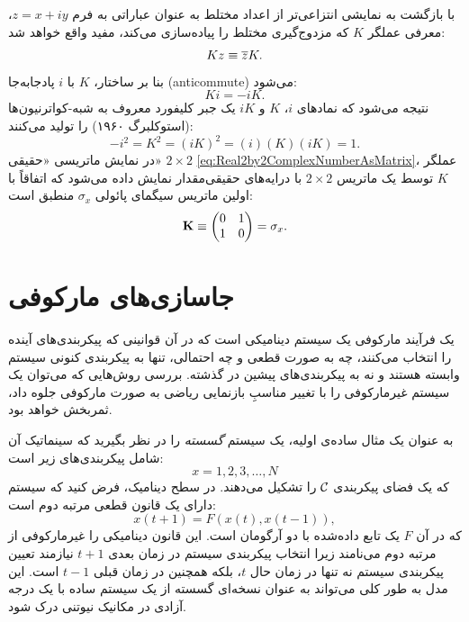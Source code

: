\documentclass{article}
\begin{document}
با بازگشت به نمایشی انتزاعی‌تر از اعداد مختلط به عنوان عباراتی به فرم $z=x+iy$، معرفی عملگر $K$ که مزدوج‌گیری مختلط را پیاده‌سازی می‌کند، مفید واقع خواهد شد:
\begin{equation}
Kz\equiv\overline{z}K.\label{eq:DefComplexConjOperator}
\end{equation}
 بنا بر ساختار، $K$ با $i$ پادجابه‌جا (anticommute) می‌شود:
\begin{equation}
Ki=-iK.\label{eq:ComplexConjOpAnticommutesWithi}
\end{equation}
 نتیجه می‌شود که نمادهای $i$، $K$ و $iK$ یک جبر کلیفورد معروف به شبه-کواترنیون‌ها (استوکلبرگ ۱۹۶۰)\nocite{Stueckelberg:1960qtirhs} را تولید می‌کنند:
\begin{equation}
-i^{2}=K^{2}=\left(iK\right)^{2}=\left(i\right)\left(K\right)\left(iK\right)=1.\label{eq:ElementaryPseudoQuaternionsAlgebra}
\end{equation}
 در نمایش ماتریسی «حقیقی» $2\times2$ \eqref{eq:Real2by2ComplexNumberAsMatrix}، عملگر $K$ توسط یک ماتریس $2\times2$ با درایه‌های حقیقی‌مقدار نمایش داده می‌شود که اتفاقاً با اولین ماتریس سیگمای پائولی $\sigma_{x}$ منطبق است:
\begin{equation}
\mathbf{K}\equiv\begin{pmatrix}0 & 1\\
1 & 0
\end{pmatrix}=\sigma_{x}.\label{eq:ComplexConjOpAsPauliSigmaMatrix}
\end{equation}

\section{جاسازی‌های مارکوفی\label{sec:Markovian-Embeddings}}

یک فرآیند مارکوفی یک سیستم دینامیکی است که در آن قوانینی که پیکربندی‌های آینده را انتخاب می‌کنند، چه به صورت قطعی و چه احتمالی، تنها به پیکربندی کنونی سیستم وابسته هستند و نه به پیکربندی‌های پیشین در گذشته. بررسی روش‌هایی که می‌توان یک سیستم غیرمارکوفی را با تغییر مناسبِ بازنمایی ریاضی به صورت مارکوفی جلوه داد، ثمر‌بخش خواهد بود.

به عنوان یک مثال ساده‌ی اولیه، یک سیستم \emph{گسسته} را در نظر بگیرید که سینماتیک آن شامل پیکربندی‌های زیر است:
\begin{equation}
x=1,2,3,\dots,N\label{eq:2ndOrderDiscreteSystemConfigurations}
\end{equation}
 که یک فضای پیکربندی $\mathcal{C}$ را تشکیل می‌دهند. در سطح دینامیک، فرض کنید که سیستم دارای یک قانون قطعی مرتبه دوم است:
\begin{equation}
x\left(t+1\right)=F\left(x\left(t\right),x\left(t-1\right)\right),\label{eq:2ndOrderDiscreteSystemLaw}
\end{equation}
 که در آن $F$ یک تابع داده‌شده با دو آرگومان است. این قانون دینامیکی را غیرمارکوفی از مرتبه دوم می‌نامند زیرا انتخاب پیکربندی سیستم در زمان بعدی $t+1$ نیازمند تعیین پیکربندی سیستم نه تنها در زمان حال $t$، بلکه همچنین در زمان قبلی $t-1$ است. این مدل به طور کلی می‌تواند به عنوان نسخه‌ای گسسته از یک سیستم ساده با یک درجه آزادی در مکانیک نیوتنی درک شود.
\end{document}
